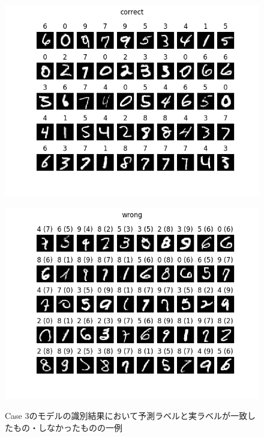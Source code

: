 \documentclass[class=jsarticle, crop=false, dvipdfmx, fleqn]{standalone}
\begin{document}
\begin{figure}
	\begin{minipage}[b]{0.45\linewidth}
		\centering
		\includegraphics[clip, width=\linewidth]{../figures/result_assignment2_case3_correct.png}
		\label{fig:case3_correct}
	\end{minipage}
	\begin{minipage}[b]{0.45\linewidth}
		\centering
		\includegraphics[clip, width=\linewidth]{../figures/result_assignment2_case3_wrong.png}
		\label{fig:case3_wrong}
	\end{minipage}
	\caption{Case 3のモデルの識別結果において予測ラベルと実ラベルが一致したもの・しなかったものの一例}
	\label{fig:case3_result}
\end{figure}
\end{document}
